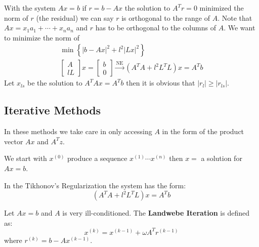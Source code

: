 With the system $Ax=b$ if $r=b-Ax$ the solution to $A^Tr=0$ minimized the norm of $r$ (the residual) we can say $r$ is orthogonal to the range of $A$. Note that $Ax=x_1 a_1 + \cdots + x_n a_n$ and $r$ has to be orthogonal to the columns of $A$. We want to minimize the norm of 
\begin{gather*}
\min \left\{ |b-Ax|^2 + l^2 |Lx|^2\right \}\\
\begin{bmatrix} A \\ lL \end{bmatrix} x = \begin{bmatrix} b \\ 0 \end{bmatrix} \xrightarrow{\text{NE}} (A^TA + l^2 L^TL) x = A^Tb
\end{gather*}
Let $x_{ls}$ be the solution to $A^TAx=A^Tb$ then it is obvious that $|r_l|\geq |r_{ls} |$.

\subsection{Iterative Methods}
In these methods we take care in only accessing $A$ in the form of the product vector $Ax$ and $A^Tz$.

We start with $x^{(0)} $ produce a sequence $x^{(1)} \cdots x^{(n)} $ then $x=$ a solution for $Ax=b$.

In the Tikhonov's Regularization the system has the form:
$$(A^TA + l^2L^TL) x = A^Tb$$

\begin{ddef}
Let $Ax=b$ and $A$ is very ill-conditioned. The \textbf{Landwebe Iteration} is defined as:
$$x^{(k)} = x^{(k-1)} + \omega A^T r^{(k-1)} $$
where $r^{(k)}=b-Ax^{(k-1)}$.
\end{ddef}
